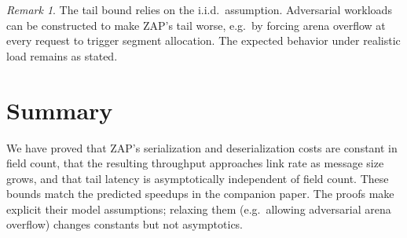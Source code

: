\documentclass[11pt]{article}
\theoremstyle{definition}
\theoremstyle{remark}
\newtheorem*{remark}{Remark}
\begin{document}
\begin{remark}
The tail bound  relies on the i.i.d.\ assumption.
Adversarial workloads can be constructed to make ZAP's tail worse,
e.g.\ by forcing arena overflow at every request to trigger segment
allocation. The expected behavior under realistic load remains as
stated.
\end{remark}

\section{Summary}
\label{sec:summary}

We have proved that ZAP's serialization and deserialization costs are
constant in field count, that the resulting throughput approaches
link rate as message size grows, and that tail latency is
asymptotically independent of field count. These bounds match the
predicted speedups in the companion paper. The proofs make explicit
their model assumptions; relaxing them (e.g.\ allowing adversarial
arena overflow) changes constants but not asymptotics.
\end{document}
